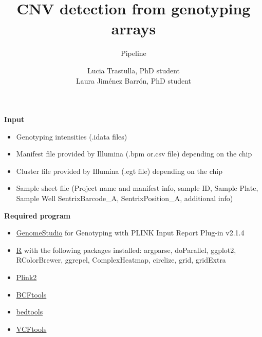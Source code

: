\documentclass[11pt]{paper}
\title{CNV detection from genotyping arrays}
\subtitle{\Large Pipeline}
\author{\small Lucia Trastulla, PhD student\\
Laura Jim\'enez Barr\'on, PhD student }
\affil{\small Max Planck Institute for Psychiatry, \\Ziller lab}
\begin{document}
\maketitle
\textbf{\large Input}
\begin{itemize}
\item Genotyping intensities (.idata files) 
\item Manifest file provided by Illumina (.bpm or.csv file) depending on the chip
\item Cluster file provided by Illumina (.egt file) depending on the chip
\item Sample sheet file (Project name and manifest info, sample ID, Sample Plate, Sample Well SentrixBarcode\_A, SentrixPosition\_A, additional info)
\end{itemize}

\textbf{\large Required program}
\begin{itemize}
\item \href{https://support.illumina.com/array/array_software/genomestudio/downloads.html}{GenomeStudio} for Genotyping with PLINK Input Report Plug-in v2.1.4 
\item \href{https://www.r-project.org/}{R} with the following packages installed: argparse, doParallel, ggplot2, RColorBrewer, ggrepel, ComplexHeatmap, circlize, grid, gridExtra
\item \href{https://www.cog-genomics.org/plink2}{Plink2}
\item \href{https://samtools.github.io/bcftools/howtos/index.html}{BCFtools}
\item \href{http://bedtools.readthedocs.io/en/latest/}{bedtools}
\item \href{https://vcftools.github.io/downloads.html}{VCFtools}
\end{itemize}
\end{document}
